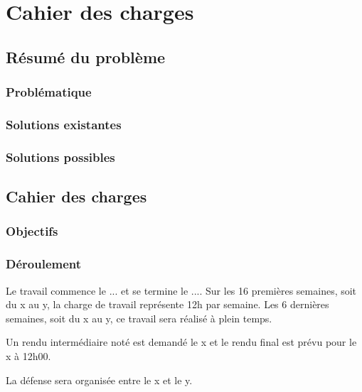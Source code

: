 \chapter{Cahier des charges}



\section*{Résumé du problème}
\lipsum[110-111]

\subsection*{Problématique}
\lipsum[110-110]

\subsection*{Solutions existantes}
\lipsum[1-1]

\subsection*{Solutions possibles}
\lipsum[1-1]



\section*{Cahier des charges}
\lipsum[1-1]


\subsection*{Objectifs}
\lipsum[1-1]

\subsection*{Déroulement}
Le travail commence le ... et se termine le .... Sur les 16 premières semaines, soit du x au y, la charge de travail représente 12h par semaine. Les 6 dernières semaines, soit du x au y, ce travail sera réalisé à plein temps.

Un rendu intermédiaire noté est demandé le x et le rendu final est prévu pour le x à 12h00. 

La défense sera organisée entre le x et le y.

